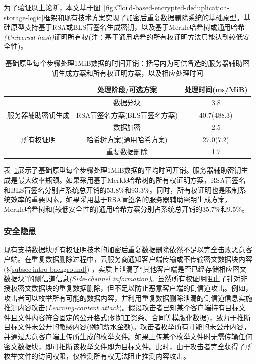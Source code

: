 为了验证以上论断，本文基于图~\ref{fig:Cloud-based-encrypted-deduplication-storage-logic}框架和现有技术方案实现了加密后重复数据删除系统的基础原型。基础原型支持基于RSA\cite{bellare2013DupLESS}或BLS\cite{armknecht2015transparent}盲签名生成密钥，以及基于Merkle哈希树\cite{halevi2011proofs}或通用哈希\textit{(Universal hash)}\cite{xu2013weak}证明所有权(注：基于通用哈希的所有权证明方法\cite{xu2013weak}只能达到较低安全性)。

\begin{table}[!htb]
    \small
    \centering
    \begin{tabular}{@{}ccc@{}}
        \toprule
                                    & 处理阶段/可选方案            & 处理时间(ms/MiB) \\ \midrule
                                    & 数据分块                     & 3.8              \\
        服务器辅助密钥生成          & RSA盲签名方案(BLS盲签名方案) & 40.7(488.3)      \\
        \multirow{3}{*}{所有权证明} & 数据加密                     & 2.5              \\
                                    & 哈希树方案(通用哈希方案)     & 27.0(7.2)        \\
                                    & 重复数据删除                 & 1.7              \\ \bottomrule
    \end{tabular}
    \caption{基础原型每个步骤处理1MiB数据的时间开销：括号内为可供备选的服务器辅助密钥生成方案和所有权证明方案，以及相应处理时间}
    \label{tab:intro-bottleneck}
\end{table}

表~\ref{tab:intro-bottleneck}展示了基础原型每个步骤处理1MiB数据的平均时间开销。服务器辅助密钥生成是最大效率瓶颈。如果采用基于Merkle哈希树的所有权证明方案，RSA盲签名和BLS盲签名分别占系统总开销的53.8\%和93.3\%。同时，所有权证明也是限制系统效率的重要因素，如果采用基于RSA盲签名的服务器辅助密钥生成方案，Merkle哈希树和(较低安全性的)通用哈希方案分别占系统总开销的35.7\%和9.5\%。

\subsubsection{安全隐患}
\label{subsubsec:intro-problem-security}

现有支持数据块所有权证明技术的加密后重复数据删除依然不足以完全击败恶意客户端。在重复数据删除过程中，云服务商通知客户端传输或不传输密文数据块内容(\S\ref{subsec:intro-background}) ，实质上泄漏了“其他客户端是否已经存储相应密文数据块”的侧信道信息\textit{(Side-channel information)}。虽然所有权证明阻止了针对非授权密文数据块的重复数据删除，但不足以防止恶意客户端的侧信道攻击。例如，攻击者可以枚举所有可能的数据内容，并利用重复数据删除泄漏的侧信道信息实施推测内容攻击(\textit{Learning-content attack})\cite{harnik2010side,zuo2018mitigating}。假设攻击者已知某个客户端持有目标文件且文件内容符合固定的公开格式(例如工资条、合同等模版化数据)，致力于推断目标文件未公开的敏感内容(例如薪水金额)。攻击者枚举所有可能的未公开内容，并通过恶意客户端上传所生成的枚举文件。如果上传某个枚举文件时无需传输任何密文数据块，即可推断该枚举文件即为目标文件。此时，由于攻击者完全获得了所枚举文件的访问权限，仅检测所有权无法阻止推测内容攻击。

